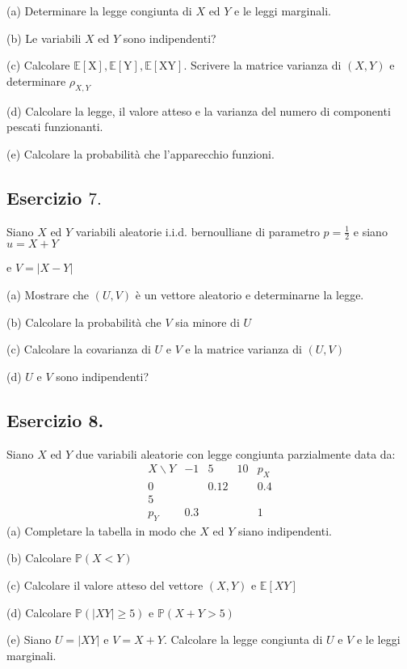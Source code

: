 (a) Determinare la legge congiunta di $X$ ed $Y$ e le leggi marginali.

(b) Le variabili $X$ ed $Y$ sono indipendenti?

(c) Calcolare $\mathbb{E} [\mathrm{X} ],\mathbb{E} [\mathrm{Y} ],\mathbb{E} [\mathrm{XY} ].$ Scrivere la matrice varianza di $(X,Y)$ e determinare $\rho _{X,Y}$

(d) Calcolare la legge, il valore atteso e la varianza del numero di componenti pescati funzionanti.

(e) Calcolare la probabilità che l'apparecchio funzioni.
\subsection{Esercizio $7.$ }

Siano $X$ ed $Y$ variabili aleatorie i.i.d. bernoulliane di parametro $p=\frac{1}{2}$ e siano $u=X+Y$

e $V=|X-Y|$

(a) Mostrare che $(U,V)$ è un vettore aleatorio e determinarne la legge.

(b) Calcolare la probabilità che $V$ sia minore di $U$

(c) Calcolare la covarianza di $U$ e $V$ e la matrice varianza di $(U,V)$

(d) $U$ e $V$ sono indipendenti?
\subsection{Esercizio 8.}

Siano $X$ ed $Y$ due variabili aleatorie con legge congiunta parzialmente data da:
\begin{equation*}
\begin{array}{ c|c|c|c|c }
X\backslash Y & -1 & 5 & 10 & p_{X}\\
\hline
0 &  & 0.12 &  & 0.4\\
\hline
5 &  &  &  & \\
\hline
p_{Y} & 0.3 &  &  & 1
\end{array}
\end{equation*}
(a) Completare la tabella in modo che $X$ ed $Y$ siano indipendenti.

(b) Calcolare $\mathbb{P} (X< Y)$

(c) Calcolare il valore atteso del vettore $(X,Y)$ e $\mathbb{E} [XY]$

(d) Calcolare $\mathbb{P} (|XY|\geq 5)$ e $\mathbb{P} (X+Y >5)$

(e) Siano $U=|XY|$ e $V=X+Y$. Calcolare la legge congiunta di $U$ e $V$ e le leggi marginali.
